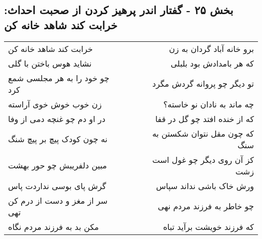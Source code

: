\begin{center}
\section*{بخش ۲۵ - گفتار اندر پرهیز کردن از صحبت احداث: خرابت کند شاهد خانه کن}
\label{sec:025}
\begin{longtable}{l p{0.5cm} r}
خرابت کند شاهد خانه کن
&&
برو خانه آباد گردان به زن
\\
نشاید هوس باختن با گلی
&&
که هر بامدادش بود بلبلی
\\
چو خود را به هر مجلسی شمع کرد
&&
تو دیگر چو پروانه گردش مگرد
\\
زن خوب خوش خوی آراسته
&&
چه ماند به نادان نو خاسته؟
\\
در او دم چو غنچه دمی از وفا
&&
که از خنده افتد چو گل در قفا
\\
نه چون کودک پیچ بر پیچ شنگ
&&
که چون مقل نتوان شکستن به سنگ
\\
مبین دلفریبش چو حور بهشت
&&
کز آن روی دیگر چو غول است زشت
\\
گرش پای بوسی نداردت پاس
&&
ورش خاک باشی نداند سپاس
\\
سر از مغز و دست از درم کن تهی
&&
چو خاطر به فرزند مردم نهی
\\
مکن بد به فرزند مردم نگاه
&&
که فرزند خویشت برآید تباه
\\
\end{longtable}
\end{center}
